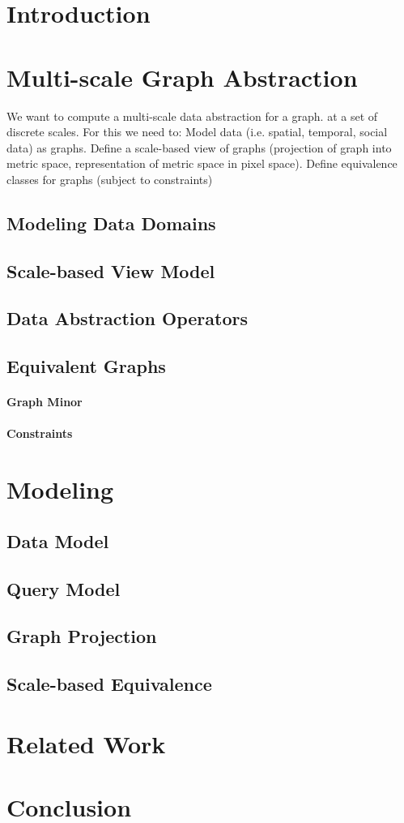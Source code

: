 
\section{Introduction}

\section{Multi-scale Graph Abstraction}
We want to compute a multi-scale data abstraction for a graph. at a set of discrete scales. For this we need to: Model data (i.e. spatial, temporal, social data) as graphs. Define a scale-based view of graphs (projection of graph into metric space, representation of metric space in pixel space). Define equivalence classes for graphs (subject to constraints)
\subsection{Modeling Data Domains}
\subsection{Scale-based View Model}

\subsection{Data Abstraction Operators}
\subsection{Equivalent Graphs}
\paragraph{Graph Minor}
\paragraph{Constraints}


\section{Modeling}
\subsection{Data Model}
\subsection{Query Model}
\subsection{Graph Projection}
\subsection{Scale-based Equivalence}

\section{Related Work}

\section{Conclusion}